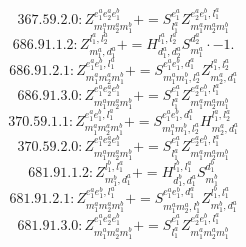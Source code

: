 \documentclass[letterpaper,10pt,fleqn,leqno,onecolumn]{article}
\begin{document}
\begin{equation} \;\;\;\;\;\;  367.59.2.0: Z^{e_{1}^{a}e_{2}^{a}e_{1}^{b}}_{m_{1}^{a}m_{2}^{a}m_{1}^{b}}+=S^{e_{1}^{a}}_{l_{1}^{a}}Z^{e_{2}^{a}e_{1}^{b},l_{1}^{a}}_{m_{1}^{a}m_{2}^{a}m_{1}^{b}} \end{equation}
\begin{equation} \;\;\;\;\;\;  686.91.1.2: Z^{l_{1}^{a},l_{2}^{a}}_{m_{1}^{a},d_{1}^{a}}+=H^{l_{1}^{a},l_{2}^{a}}_{d_{1}^{a},d_{2}^{a}}S^{d_{2}^{a}}_{m_{1}^{a}}\cdot -1. \end{equation}
\begin{equation} \;\;\;\;\;\;  686.91.2.1: Z^{e_{1}^{a}e_{1}^{b},l_{1}^{a}}_{m_{1}^{a}m_{2}^{a}m_{1}^{b}}+=S^{e_{1}^{a}e_{1}^{b},d_{1}^{a}}_{m_{1}^{a}m_{1}^{b},l_{2}^{a}}Z^{l_{1}^{a},l_{2}^{a}}_{m_{2}^{a},d_{1}^{a}} \end{equation}
\begin{equation} \;\;\;\;\;\;  686.91.3.0: Z^{e_{1}^{a}e_{2}^{a}e_{1}^{b}}_{m_{1}^{a}m_{2}^{a}m_{1}^{b}}+=S^{e_{1}^{a}}_{l_{1}^{a}}Z^{e_{2}^{a}e_{1}^{b},l_{1}^{a}}_{m_{1}^{a}m_{2}^{a}m_{1}^{b}} \end{equation}
\begin{equation} \;\;\;\;\;\;  370.59.1.1: Z^{e_{1}^{a}e_{1}^{b},l_{1}^{a}}_{m_{1}^{a}m_{2}^{a}m_{1}^{b}}+=S^{e_{1}^{a}e_{1}^{b},d_{1}^{a}}_{m_{1}^{a}m_{1}^{b},l_{2}^{a}}H^{l_{1}^{a},l_{2}^{a}}_{m_{2}^{a},d_{1}^{a}} \end{equation}
\begin{equation} \;\;\;\;\;\;  370.59.2.0: Z^{e_{1}^{a}e_{2}^{a}e_{1}^{b}}_{m_{1}^{a}m_{2}^{a}m_{1}^{b}}+=S^{e_{1}^{a}}_{l_{1}^{a}}Z^{e_{2}^{a}e_{1}^{b},l_{1}^{a}}_{m_{1}^{a}m_{2}^{a}m_{1}^{b}} \end{equation}
\begin{equation} \;\;\;\;\;\;  681.91.1.2: Z^{l_{1}^{b},l_{1}^{a}}_{m_{1}^{b},d_{1}^{a}}+=H^{l_{1}^{b},l_{1}^{a}}_{d_{1}^{b},d_{1}^{a}}S^{d_{1}^{b}}_{m_{1}^{b}} \end{equation}
\begin{equation} \;\;\;\;\;\;  681.91.2.1: Z^{e_{1}^{a}e_{1}^{b},l_{1}^{a}}_{m_{1}^{a}m_{2}^{a}m_{1}^{b}}+=S^{e_{1}^{a}e_{1}^{b},d_{1}^{a}}_{m_{1}^{a}m_{2}^{a},l_{1}^{b}}Z^{l_{1}^{b},l_{1}^{a}}_{m_{1}^{b},d_{1}^{a}} \end{equation}
\begin{equation} \;\;\;\;\;\;  681.91.3.0: Z^{e_{1}^{a}e_{2}^{a}e_{1}^{b}}_{m_{1}^{a}m_{2}^{a}m_{1}^{b}}+=S^{e_{1}^{a}}_{l_{1}^{a}}Z^{e_{2}^{a}e_{1}^{b},l_{1}^{a}}_{m_{1}^{a}m_{2}^{a}m_{1}^{b}} \end{equation}
\end{document}

